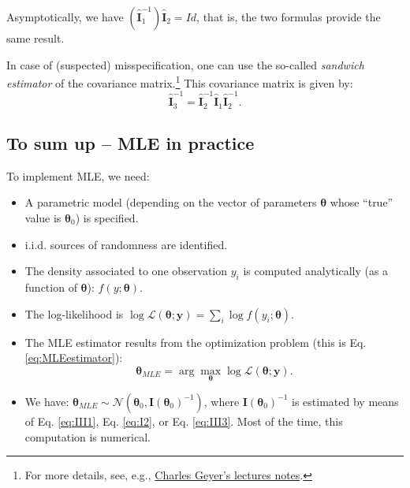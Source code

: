 \documentclass[
  12pt,
]{book}
\providecommand{\tightlist}{%
  \setlength{\itemsep}{0pt}\setlength{\parskip}{0pt}}
\theoremstyle{definition}
\theoremstyle{definition}
\theoremstyle{definition}
\theoremstyle{definition}
\theoremstyle{remark}
\begin{document}
Asymptotically, we have \((\hat{\mathbf{I}}_1^{-1})\hat{\mathbf{I}}_2=Id\), that is, the two formulas provide the same result.

In case of (suspected) misspecification, one can use the so-called \emph{sandwich estimator} of the covariance matrix.\footnote{For more details, see, e.g., \href{https://www.stat.umn.edu/geyer/5601/notes/sand.pdf}{Charles Geyer's lectures notes}.} This covariance matrix is given by:
\begin{equation}
\hat{\mathbf{I}}_3^{-1} = \hat{\mathbf{I}}_2^{-1} \hat{\mathbf{I}}_1 \hat{\mathbf{I}}_2^{-1}.\label{eq:III3}
\end{equation}

\hypertarget{to-sum-up-mle-in-practice}{%
\subsection{To sum up -- MLE in practice}\label{to-sum-up-mle-in-practice}}

To implement MLE, we need:

\begin{itemize}
\tightlist
\item
  A parametric model (depending on the vector of parameters \(\boldsymbol\theta\) whose ``true'' value is \(\boldsymbol\theta_0\)) is specified.
\item
  i.i.d. sources of randomness are identified.
\item
  The density associated to one observation \(y_i\) is computed analytically (as a function of \(\boldsymbol\theta\)): \(f(y;\boldsymbol\theta)\).
\item
  The log-likelihood is \(\log \mathcal{L}(\boldsymbol\theta;\mathbf{y}) = \sum_i \log f(y_i;\boldsymbol\theta)\).
\item
  The MLE estimator results from the optimization problem (this is Eq. \eqref{eq:MLEestimator}):
  \begin{equation}
  \boldsymbol\theta_{MLE} = \arg \max_{\boldsymbol\theta} \log \mathcal{L}(\boldsymbol\theta;\mathbf{y}).
  \end{equation}
\item
  We have: \(\boldsymbol\theta_{MLE} \sim \mathcal{N}({\boldsymbol\theta}_0,\mathbf{I}(\boldsymbol\theta_0)^{-1})\), where \(\mathbf{I}(\boldsymbol\theta_0)^{-1}\) is estimated by means of Eq. \eqref{eq:III1}, Eq. \eqref{eq:I2}, or Eq. \eqref{eq:III3}. Most of the time, this computation is numerical.
\end{itemize}
\end{document}
